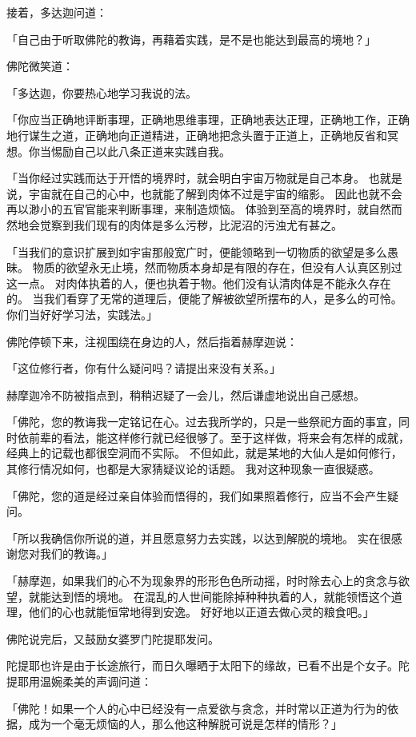 \documentclass[twoside,openany]{book}
\begin{document}
接着，多达迦问道：

「自己由于听取佛陀的教诲，再藉着实践，是不是也能达到最高的境地？」

佛陀微笑道：

「多达迦，你要热心地学习我说的法。

「你应当正确地评断事理，正确地思维事理，正确地表达正理，正确地工作，正确地行谋生之道，正确地向正道精进，正确地把念头置于正道上，正确地反省和冥想。你当惕励自己以此八条正道来实践自我。

「当你经过实践而达于开悟的境界时，就会明白宇宙万物就是自己本身。
也就是说，宇宙就在自己的心中，也就能了解到肉体不过是宇宙的缩影。
因此也就不会再以渺小的五官官能来判断事理，来制造烦恼。
体验到至高的境界时，就自然而然地会觉察到我们现有的肉体是多么污秽，比泥沼的污浊尤有甚之。

「当我们的意识扩展到如宇宙那般宽广时，便能领略到一切物质的欲望是多么愚昧。
物质的欲望永无止境，然而物质本身却是有限的存在，但没有人认真区别过这一点。
对肉体执着的人，便也执着于物。他们没有认清肉体是不能永久存在的。
当我们看穿了无常的道理后，便能了解被欲望所摆布的人，是多么的可怜。
你们当好好学习法，实践法。」

佛陀停顿下来，注视围绕在身边的人，然后指着赫摩迦说：

「这位修行者，你有什么疑问吗？请提出来没有关系。」

赫摩迦冷不防被指点到，稍稍迟疑了一会儿，然后谦虚地说出自己感想。

「佛陀，您的教诲我一定铭记在心。过去我所学的，只是一些祭祀方面的事宜，同时依前辈的看法，能这样修行就已经很够了。至于这样做，将来会有怎样的成就，经典上的记载也都很空洞而不实际。
不但如此，就是某地的大仙人是如何修行，其修行情况如何，也都是大家猜疑议论的话题。
我对这种现象一直很疑惑。

「佛陀，您的道是经过亲自体验而悟得的，我们如果照着修行，应当不会产生疑问。

「所以我确信你所说的道，并且愿意努力去实践，以达到解脱的境地。
实在很感谢您对我们的教诲。」

「赫摩迦，如果我们的心不为现象界的形形色色所动摇，时时除去心上的贪念与欲望，就能达到悟的境地。
在混乱的人世间能除掉种种执着的人，就能领悟这个道理，他们的心也就能恒常地得到安逸。
好好地以正道去做心灵的粮食吧。」

佛陀说完后，又鼓励女婆罗门陀提耶发问。

陀提耶也许是由于长途旅行，而日久曝晒于太阳下的缘故，已看不出是个女子。陀提耶用温婉柔美的声调问道：

「佛陀！如果一个人的心中已经没有一点爱欲与贪念，并时常以正道为行为的依据，成为一个毫无烦恼的人，那么他这种解脱可说是怎样的情形？」
\end{document}
